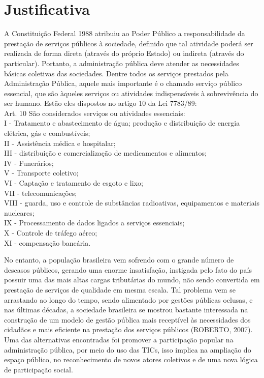 \documentclass[12pt]{article}
\begin{document}
\section{Justificativa}
A Constituição Federal 1988 atribuiu ao Poder Público a responsabilidade da prestação de serviços públicos à sociedade, definido que tal atividade poderá ser realizada de forma direta (através do próprio Estado) ou indireta (através do particular). Portanto, a administração pública deve atender as necessidades básicas coletivas das sociedades. Dentre todos os serviços prestados pela Administração Pública, aquele mais importante é o chamado serviço público essencial, que são àqueles serviços ou atividades indispensáveis à sobrevivência do ser humano. Estão eles dispostos no artigo 10 da Lei 7783/89:
\\Art. 10 São considerados serviços ou atividades essenciais:
\\I - Tratamento e abastecimento de água; produção e distribuição de energia elétrica, gás e combustíveis;    
\\II - Assistência médica e hospitalar;
\\III - distribuição e comercialização de medicamentos e alimentos;
\\IV - Funerários;
\\V - Transporte coletivo;
\\VI - Captação e tratamento de esgoto e lixo;
\\VII - telecomunicações;
\\VIII - guarda, uso e controle de substâncias radioativas, equipamentos e materiais nucleares;
\\IX - Processamento de dados ligados a serviços essenciais;
\\X - Controle de tráfego aéreo;
\\XI - compensação bancária.

No entanto, a população brasileira vem sofrendo com o grande número de descasos públicos, gerando uma enorme insatisfação, instigada pelo fato do país possuir uma das mais altas cargas tributárias do mundo, não sendo convertida em prestação de serviços de qualidade em mesma escala. Tal problema vem se arrastando ao longo do tempo, sendo alimentado por gestões públicas oclusas, e nas últimas décadas, a sociedade brasileira se mostrou bastante interessada na construção de um modelo de gestão pública mais receptível às necessidades dos cidadãos e mais eficiente na prestação dos serviços públicos (ROBERTO, 2007). Uma das alternativas encontradas foi promover a participação popular na administração pública, por meio do uso das TICs, isso implica na ampliação do espaço público, no reconhecimento de novos atores coletivos e de uma nova lógica de participação social.
\end{document}
